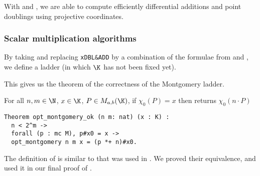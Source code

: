 With  and , we are able to compute efficiently
differential additions and point doublings using projective coordinates.

\subsubsection{Scalar multiplication algorithms}
\label{subsec:ECC-ladder}

By taking  and replacing \texttt{xDBL\&ADD} by a
combination of the formulae from  and ,
we define a ladder  (in which $\K$ has not been fixed yet).

%

This gives us the theorem of the correctness of the Montgomery ladder.
\begin{theorem}
\label{thm:montgomery-ladder-correct}
For all $n, m \in \N$, $x \in \K$, $P \in M_{a,b}(\K)$,
if $\chi_0(P) = x$ then  returns $\chi_0(n \cdot P)$
\end{theorem}
\begin{lstlisting}[language=Coq]
Theorem opt_montgomery_ok (n m: nat) (x : K) :
  n < 2^m ->
  forall (p : mc M), p#x0 = x ->
  opt_montgomery n m x = (p *+ n)#x0.
\end{lstlisting}
The definition of  is similar to 
that was used in .
We proved their equivalence, and used it in our
final proof of .


